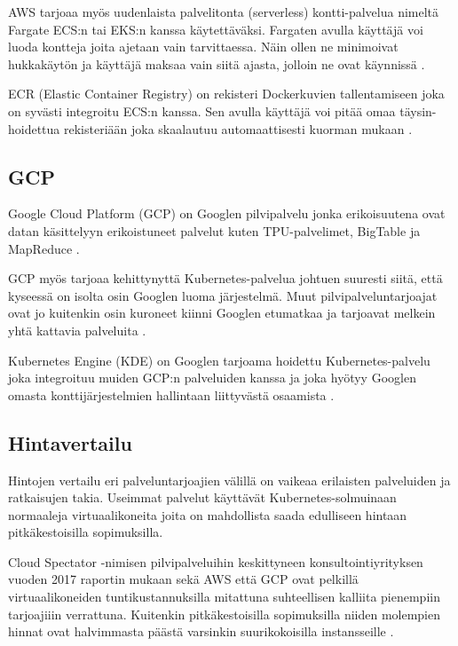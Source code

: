 \documentclass[finnish,gradu]{tktltiki3}
\begin{document}
AWS tarjoaa myös uudenlaista palvelitonta (serverless) kontti-palvelua nimeltä Fargate ECS:n tai EKS:n kanssa käytettäväksi. Fargaten avulla käyttäjä voi luoda kontteja joita ajetaan vain tarvittaessa. Näin ollen ne minimoivat hukkakäytön ja käyttäjä maksaa vain siitä ajasta, jolloin ne ovat käynnissä \cite{aws-docs-fargate}.

ECR (Elastic Container Registry) on rekisteri Dockerkuvien tallentamiseen joka on syvästi integroitu ECS:n kanssa. Sen avulla käyttäjä voi pitää omaa täysin-hoidettua rekisteriään joka skaalautuu automaattisesti kuorman mukaan \cite{aws-docs-ecr}.

\subsection{GCP}
\label{sb:gcp}

Google Cloud Platform (GCP) on Googlen pilvipalvelu jonka erikoisuutena ovat datan käsittelyyn erikoistuneet palvelut kuten TPU-palvelimet, BigTable ja MapReduce \cite{gcp-advantages}.

GCP myös tarjoaa kehittynyttä Kubernetes-palvelua johtuen suuresti siitä, että kyseessä on isolta osin Googlen luoma järjestelmä. Muut pilvipalveluntarjoajat ovat jo kuitenkin osin kuroneet kiinni Googlen etumatkaa ja tarjoavat melkein yhtä kattavia palveluita \cite{kubernetes-competition}.

Kubernetes Engine (KDE) on Googlen tarjoama hoidettu Kubernetes-palvelu joka integroituu muiden GCP:n palveluiden kanssa ja joka hyötyy Googlen omasta konttijärjestelmien hallintaan liittyvästä osaamista \cite{kde-docs}.

\subsection{Hintavertailu}

Hintojen vertailu eri palveluntarjoajien välillä on vaikeaa erilaisten palveluiden ja ratkaisujen takia. Useimmat palvelut käyttävät Kubernetes-solmuinaan normaaleja virtuaalikoneita joita on mahdollista saada edulliseen hintaan pitkäkestoisilla sopimuksilla.

Cloud Spectator -nimisen pilvipalveluihin keskittyneen konsultointiyrityksen vuoden 2017 raportin mukaan sekä AWS että GCP ovat pelkillä virtuaalikoneiden tuntikustannuksilla mitattuna suhteellisen kalliita pienempiin tarjoajiiin verrattuna. Kuitenkin pitkäkestoisilla sopimuksilla niiden molempien hinnat ovat halvimmasta päästä varsinkin suurikokoisilla instansseille \cite{cloud-price-comparison}.
\end{document}
